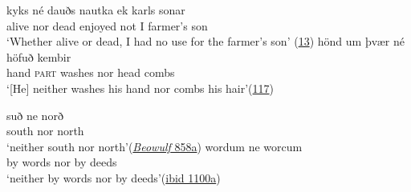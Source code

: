 \ea \label{ex:10-43}
\ea 
 \gll kyks né dauðs nautka ek karls sonar\\ %
 alive nor dead {enjoyed not} I farmer's son\\
 \glt `Whether alive or dead, I had no use for the farmer's son'
\hfill(\href{https://archive.org/details/oldnordisklaese01wimmgoog/page/n23/mode/2up?q=kyks&view=theater}{13})
 \ex 
 \gll hönd um þvær né höfuð kembir\\
 hand \textsc{part} washes nor head combs\\ %
 \glt `[He] neither washes his hand nor combs his hair'\hfill(\href{https://archive.org/details/oldnordisklaese01wimmgoog/page/n123/mode/2up?q=kembir&view=theater}{117}) %
 \z
\z

\ea \label{ex:10-45}
 \ea
 \gll suð ne norð\\
 south nor north\\
 \glt `neither south nor north'\hfill(\href{http://ebeowulf.uky.edu/ebeo4.0/CD/main.html}{\textit{Beowulf} 858a}) %
 \ex 
 \gll wordum ne worcum\\
 by words nor by deeds\\
 \glt `neither by words nor by deeds'\hfill(\href{http://ebeowulf.uky.edu/ebeo4.0/CD/main.html}{ibid 1100a}) %
\z
\z

